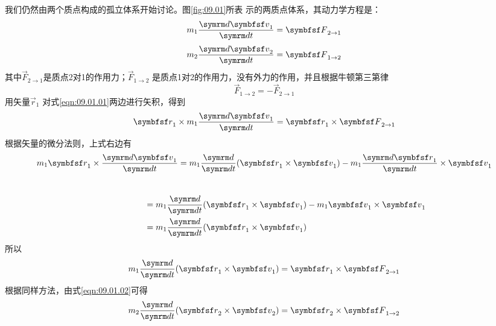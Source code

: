 我们仍然由两个质点构成的孤立体系开始讨论。图\ref{fig:09.01}所表
示的两质点体系，其动力学方程是：
\begin{equation}\label{eqn:09.01.01}
  m _ { 1 } \frac { \dif \vec{v} _ { 1 } } { \dif t } = \vec{F} _ { 2 \to 1 }
\end{equation}
\begin{equation}\label{eqn:09.01.02}
  m _ { 2 } \frac { \dif \vec{v} _ { 2 } } { \dif t } = \vec{F} _ { 1 \to 2 }
\end{equation}
其中$\vec{F} _ { 2 \to 1 }$是质点2对1的作用力；$\vec{F} _ { 1 \to 2 }$
是质点1对2的作用力，没有外力的作用，并且根据牛顿第三第律
\begin{equation}\label{eqn:09.01.03}
  \vec{F} _ { 1 \to 2 } = - \vec{F} _ { 2 \to 1 }
\end{equation}
用矢量$\vec{r} _ { 1 }$ 对式\eqref{eqn:09.01.01}两边进行矢积，得到
\begin{equation*}
  \vec{r} _ { 1 } \times m _ { 1 } \frac { \dif \vec{v} _ { 1 } } { \dif t } = \vec{r} _ { 1 } \times \vec{F} _ { 2 \to 1 }
\end{equation*}
根据矢量的微分法则，上式右边有
\begin{equation*}
  m _ 1 \vec{r} _ { 1 } \times \frac { \dif \vec{v}_ { 1 } } { \dif t } = m _ { 1 } \frac { \dif } { \dif t } ( \vec{r} _ { 1 } \times \vec{v} _ { 1 }) - m _ { 1 } \frac { \dif \vec{r} _ { 1 } } { \dif t} \times \vec{v} _ { 1 }
\end{equation*}
\clearpage\mbox{}~\vspace{-2em}
\begin{equation*}
  \begin{aligned}
    \hspace{5em} & = m _ { 1 } \frac { \dif } { \dif t } ( \vec{r} _ { 1 } \times \vec{v} _ { 1 } ) - m _ { 1 } \vec{v} _ { 1 } \times \vec{v} _ { 1 } \\
                 & = m _ { 1 } \frac { \dif } { \dif t } ( \vec{r} _ { 1 } \times \vec{v} _ { 1 } )
  \end{aligned}
\end{equation*}
所以
\begin{equation}\label{eqn:09.01.04}
  m _{ 1 } \frac { \dif }{\dif t } ( \vec{r} _ { 1 } \times \vec{v} _ { 1 } ) = \vec{r} _ { 1 } \times \vec{F} _ { 2 \to 1 }
\end{equation}
根据同样方法，由式\eqref{eqn:09.01.02}可得
\begin{equation}\label{eqn:09.01.05}
  m _{ 2 } \frac { \dif }{\dif t } ( \vec{r} _ { 2 } \times \vec{v} _ { 2 } ) = \vec{r} _ { 2 } \times \vec{F} _ { 1 \to 2 }
\end{equation}
